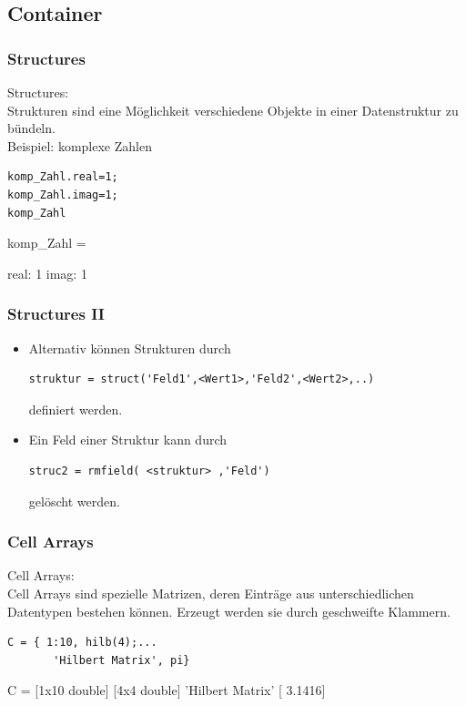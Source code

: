 \documentclass[hyperref={xetex}]{beamer}
\begin{document}
\subsection{Container}
%
%
\begin{frame}[fragile]\frametitle{Structures}
\alert{Structures:}\\
Strukturen sind eine Möglichkeit verschiedene Objekte in einer
Datenstruktur zu bündeln.\\[1cm]

\alert{Beispiel:} komplexe Zahlen
\begin{lstlisting}
komp_Zahl.real=1;
komp_Zahl.imag=1;
komp_Zahl
\end{lstlisting}
\begin{matlab}
komp_Zahl = 

    real: 1
    imag: 1
\end{matlab}
\end{frame}
%
%
\begin{frame}[fragile]\frametitle{Structures II}
\begin{itemize}
\item Alternativ können Strukturen durch
\begin{lstlisting}
struktur = struct('Feld1',<Wert1>,'Feld2',<Wert2>,..)
\end{lstlisting}
definiert werden.
\item Ein Feld einer Struktur  kann durch 
\begin{lstlisting}
struc2 = rmfield( <struktur> ,'Feld')
\end{lstlisting}
gel\"oscht werden. 
\end{itemize}
\end{frame}
%
%
\begin{frame}[fragile]\frametitle{Cell Arrays}
\alert{Cell Arrays:} \\
Cell Arrays sind spezielle Matrizen, deren  Einträge aus unterschiedlichen
Datentypen bestehen können. Erzeugt
werden sie durch geschweifte Klammern.\\
\begin{lstlisting}
C = { 1:10, hilb(4);...
       'Hilbert Matrix', pi}
\end{lstlisting} 
\begin{matlab}
C = 
       [1x10 double]    [4x4 double]
    'Hilbert Matrix'    [    3.1416]
\end{matlab} 
\end{frame}
%
%
\end{document}
